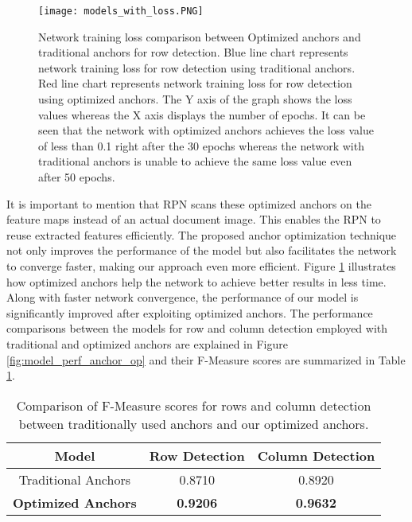 \documentclass{ieeeaccess}
\begin{document}
\begin{figure}[ht]
    \texttt{[image: models\_with\_loss.PNG]}
    \caption{Network training loss comparison between Optimized anchors and traditional anchors for row detection. Blue line chart represents network training loss for row detection using traditional anchors. Red line chart represents network training loss for row detection using optimized anchors. The Y axis of the graph shows the loss values whereas the X axis displays the number of epochs. It can be seen that the network with optimized anchors achieves the loss value of less than 0.1 right after the 30 epochs whereas the network with traditional anchors is unable to achieve the same loss value even after 50 epochs.}
    \label{fig:anchor_network}
\end{figure}

It is important to mention that RPN scans these optimized anchors on the feature maps instead of an actual document image. This enables the RPN to reuse extracted features efficiently. The proposed anchor optimization technique not only improves the performance of the model but also facilitates the network to converge faster, making our approach even more efficient. Figure \ref{fig:anchor_network} illustrates how optimized anchors help the network to achieve better results in less time. Along with faster network convergence, the performance of our model is significantly improved after exploiting optimized anchors. The performance comparisons between the models for row and column detection employed with traditional and optimized anchors are explained in Figure \ref{fig:model_perf_anchor_op} and their F-Measure scores are summarized in Table \ref{tab:anchor_result}.





\begin{table}
    \centering
    \normalsize
    \setlength\tabcolsep{5pt} 
    \setlength\extrarowheight{5pt}
    \begin{tabular}{|c|c|c|} 
    \hline  
    \normalsize {Model} &
    \normalsize  {Row Detection}&
    \normalsize  {Column Detection}\\
    \hline  
    \small {Traditional Anchors} &
    \small  {0.8710}&
    \small  {0.8920}\\
    \hline  
    \small \textbf{Optimized Anchors} &
    \small  \textbf{0.9206}&
    \small  \textbf{0.9632}\\
    
    \hline
\end{tabular}
    \caption{Comparison of F-Measure scores for rows and column detection between traditionally used anchors and our optimized anchors.}
    \label{tab:anchor_result}
\end{table}
\end{document}
